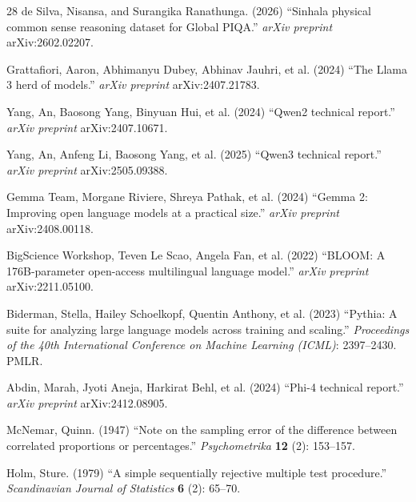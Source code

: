 \documentclass[3p,times,procedia]{elsarticle}
\begin{document}
\begin{thebibliography}{28}
de Silva, Nisansa, and Surangika Ranathunga. (2026) ``Sinhala physical common sense reasoning dataset for Global PIQA.'' {\it arXiv preprint} arXiv:2602.02207.

Grattafiori, Aaron, Abhimanyu Dubey, Abhinav Jauhri, et al. (2024) ``The Llama 3 herd of models.'' {\it arXiv preprint} arXiv:2407.21783.

Yang, An, Baosong Yang, Binyuan Hui, et al. (2024) ``Qwen2 technical report.'' {\it arXiv preprint} arXiv:2407.10671.

Yang, An, Anfeng Li, Baosong Yang, et al. (2025) ``Qwen3 technical report.'' {\it arXiv preprint} arXiv:2505.09388.

Gemma Team, Morgane Riviere, Shreya Pathak, et al. (2024) ``Gemma 2: Improving open language models at a practical size.'' {\it arXiv preprint} arXiv:2408.00118.

BigScience Workshop, Teven Le Scao, Angela Fan, et al. (2022) ``BLOOM: A 176B-parameter open-access multilingual language model.'' {\it arXiv preprint} arXiv:2211.05100.

Biderman, Stella, Hailey Schoelkopf, Quentin Anthony, et al. (2023) ``Pythia: A suite for analyzing large language models across training and scaling.'' {\it Proceedings of the 40th International Conference on Machine Learning (ICML)}: 2397--2430. PMLR.

Abdin, Marah, Jyoti Aneja, Harkirat Behl, et al. (2024) ``Phi-4 technical report.'' {\it arXiv preprint} arXiv:2412.08905.

McNemar, Quinn. (1947) ``Note on the sampling error of the difference between correlated proportions or percentages.'' {\it Psychometrika} {\bf 12} (2): 153--157.

Holm, Sture. (1979) ``A simple sequentially rejective multiple test procedure.'' {\it Scandinavian Journal of Statistics} {\bf 6} (2): 65--70.

\end{thebibliography}
\end{document}
